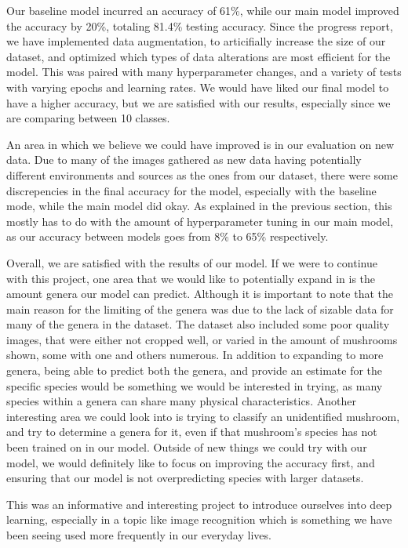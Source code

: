 \documentclass{article} %
\begin{document}
Our baseline model incurred an accuracy of 61\%, while our main model improved the accuracy by 20\%, totaling 81.4\% testing accuracy. Since the progress report, we have implemented data augmentation, to articifially increase the size of our dataset, and optimized which types of data alterations are most efficient for the model. This was paired with many hyperparameter changes, and a variety of tests with varying epochs and learning rates. We would have liked our final model to have a higher accuracy, but we are satisfied with our results, especially since we are comparing between 10 classes.

An area in which we believe we could have improved is in our evaluation on new data. Due to many of the images gathered as new data having potentially different environments and sources as the ones from our dataset, there were some discrepencies in the final accuracy for the model, especially with the baseline mode, while the main model did okay. As explained in the previous section, this mostly has to do with the amount of hyperparameter tuning in our main model, as our accuracy between models goes from 8\% to 65\% respectively. 

Overall, we are satisfied with the results of our model. If we were to continue with this project, one area that we would like to potentially expand in is the amount genera our model can predict. Although it is important to note that the main reason for the limiting of the genera was due to the lack of sizable data for many of the genera in the dataset. The dataset also included some poor quality images, that were either not cropped well, or varied in the amount of mushrooms shown, some with one and others numerous. In addition to expanding to more genera, being able to predict both the genera, and provide an estimate for the specific species would be something we would be interested in trying, as many species within a genera can share many physical characteristics. Another interesting area we could look into is trying to classify an unidentified mushroom, and try to determine a genera for it, even if that mushroom's species has not been trained on in our model. Outside of new things we could try with our model, we would definitely like to focus on improving the accuracy first, and ensuring that our model is not overpredicting species with larger datasets. 

This was an informative and interesting project to introduce ourselves into deep learning, especially in a topic like image recognition which is something we have been seeing used more frequently in our everyday lives.
\end{document}
